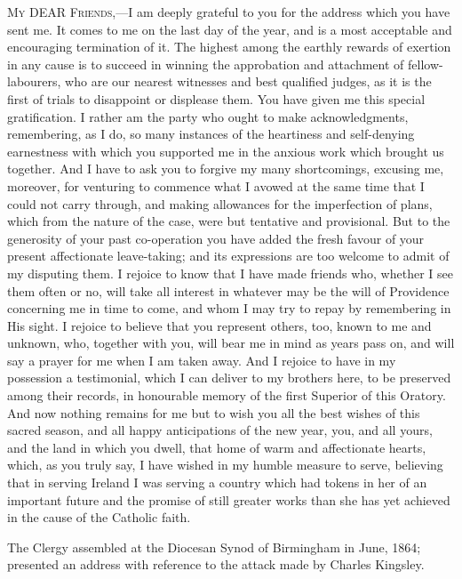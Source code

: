 M\textsc{y} DEAR
F\textsc{riends},—I am deeply grateful to you for the
address which you have sent me. It comes to me on the last day of the
year, and is a most acceptable and encouraging termination of it.
The highest among the earthly rewards of exertion in any cause is to
succeed in winning the approbation and attachment of fellow-labourers,
who are our nearest witnesses and best qualified judges, as it is the
first of trials to disappoint or displease them. You have given me
this special gratification. I rather am the party who ought to make
acknowledgments, remembering, as I do, so many instances of the
heartiness and self-denying earnestness with which you supported me in
the anxious work which brought us together. And I have to ask you to
forgive my many shortcomings, excusing me, moreover, for venturing to
commence what I avowed at the same time that I could not carry
through, and making allowances for the imperfection of plans, which
from the nature of the case, were but tentative and provisional. But
to the generosity of your past co-operation you have added the fresh
favour of your present affectionate leave-taking; and its expressions
are too welcome to admit of my disputing them. I rejoice to know that
I have made friends who, whether I see them often or no, will take all
interest in whatever may be the will of Providence concerning me in
time to come, and whom I may try to repay by remembering in His sight.
I rejoice to believe that you represent others, too, known to me and
unknown, who, together with you, will bear me in mind as years pass
on, and will say a prayer for me when I am taken away. And I rejoice
to have in my possession a testimonial, which I can deliver to my
brothers here, to be preserved among their records, in honourable
memory of the first Superior of this Oratory. And now nothing remains
for me but to wish you all the best wishes of this sacred season, and
all happy anticipations of the new year, you, and all yours, and the
land in which you dwell, that home of warm and affectionate hearts,
which, as you truly say, I have wished in my humble measure to serve,
believing that in serving Ireland I was serving a country which had
tokens in her of an important future and the promise of still greater
works than she has yet achieved in the cause of the Catholic faith.


The Clergy assembled at the Diocesan Synod of
Birmingham in June, 1864; presented an address with reference to the
attack made by Charles Kingsley.

